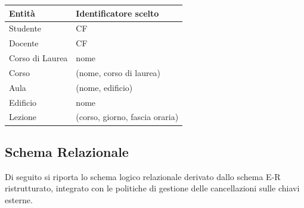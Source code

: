 \documentclass[a4paper,11pt]{article}
\begin{document}
\begin{table}[H]
    \centering
    \begin{tabular}{l l}
    \toprule
    \textbf{Entità} & \textbf{Identificatore scelto} \\
    \midrule
    Studente & CF \\
    Docente & CF \\
    Corso di Laurea & nome \\
    Corso & (nome, corso di laurea) \\
    Aula & (nome, edificio) \\
    Edificio & nome \\
    Lezione & (corso, giorno, fascia oraria) \\
    \bottomrule
    \end{tabular}
\end{table}


\subsection{Schema Relazionale}
\label{sec:logical_schema}

Di seguito si riporta lo schema logico relazionale derivato dallo schema E-R ristrutturato, integrato con le politiche di gestione delle cancellazioni sulle chiavi esterne.
\end{document}
